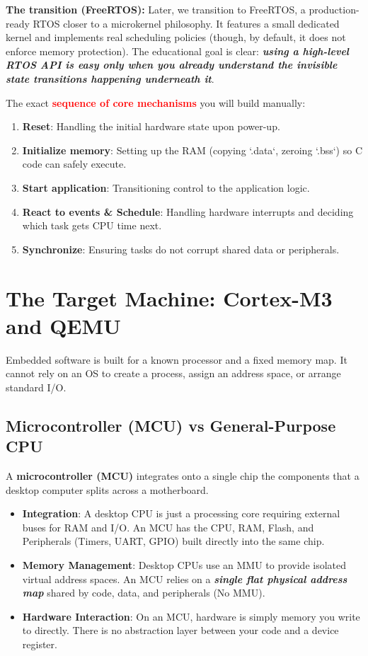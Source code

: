 \textbf{The transition (FreeRTOS):} Later, we transition to FreeRTOS, a production-ready RTOS closer to a microkernel philosophy. It features a small dedicated kernel and implements real scheduling policies (though, by default, it does not enforce memory protection). The educational goal is clear: \textbf{\textit{using a high-level RTOS API is easy only when you already understand the invisible state transitions happening underneath it}}.

The exact \textbf{\textcolor{red}{sequence of core mechanisms}} you will build manually:
\begin{enumerate}
    \item \textbf{Reset}: Handling the initial hardware state upon power-up.
    \item \textbf{Initialize memory}: Setting up the RAM (copying `.data`, zeroing `.bss`) so C code can safely execute.
    \item \textbf{Start application}: Transitioning control to the application logic.
    \item \textbf{React to events \& Schedule}: Handling hardware interrupts and deciding which task gets CPU time next.
    \item \textbf{Synchronize}: Ensuring tasks do not corrupt shared data or peripherals.
\end{enumerate}

\section{The Target Machine: Cortex-M3 and QEMU}
Embedded software is built for a known processor and a fixed memory map. It cannot rely on an OS to create a process, assign an address space, or arrange standard I/O. 

\subsection{Microcontroller (MCU) vs General-Purpose CPU}
A \textbf{microcontroller (MCU)} integrates onto a single chip the components that a desktop computer splits across a motherboard.
\begin{itemize}
    \item \textbf{Integration}: A desktop CPU is just a processing core requiring external buses for RAM and I/O. An MCU has the CPU, RAM, Flash, and Peripherals (Timers, UART, GPIO) built directly into the same chip.
    \item \textbf{Memory Management}: Desktop CPUs use an MMU to provide isolated virtual address spaces. An MCU relies on a \textbf{\textit{single flat physical address map}} shared by code, data, and peripherals (No MMU).
    \item \textbf{Hardware Interaction}: On an MCU, hardware is simply memory you write to directly. There is no abstraction layer between your code and a device register.
\end{itemize}

